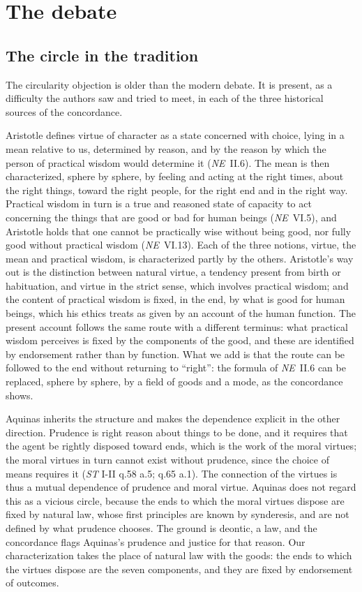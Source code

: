 \documentclass{situationist-preprint}
\begin{document}
\section{The debate}\label{s:history}

\subsection{The circle in the tradition}

The circularity objection is older than the modern debate. It is present, as a difficulty the authors saw and tried to meet, in each of the three historical sources of the concordance.

Aristotle defines virtue of character as a state concerned with choice, lying in a mean relative to us, determined by reason, and by the reason by which the person of practical wisdom would determine it (\emph{NE}~II.6). The mean is then characterized, sphere by sphere, by feeling and acting at the right times, about the right things, toward the right people, for the right end and in the right way. Practical wisdom in turn is a true and reasoned state of capacity to act concerning the things that are good or bad for human beings (\emph{NE}~VI.5), and Aristotle holds that one cannot be practically wise without being good, nor fully good without practical wisdom (\emph{NE}~VI.13). Each of the three notions, virtue, the mean and practical wisdom, is characterized partly by the others. Aristotle's way out is the distinction between natural virtue, a tendency present from birth or habituation, and virtue in the strict sense, which involves practical wisdom; and the content of practical wisdom is fixed, in the end, by what is good for human beings, which his ethics treats as given by an account of the human function. The present account follows the same route with a different terminus: what practical wisdom perceives is fixed by the components of the good, and these are identified by endorsement rather than by function. What we add is that the route can be followed to the end without returning to \enquote{right}: the formula of \emph{NE}~II.6 can be replaced, sphere by sphere, by a field of goods and a mode, as the concordance shows.

Aquinas inherits the structure and makes the dependence explicit in the other direction. Prudence is right reason about things to be done, and it requires that the agent be rightly disposed toward ends, which is the work of the moral virtues; the moral virtues in turn cannot exist without prudence, since the choice of means requires it (\emph{ST} I-II q.58 a.5; q.65 a.1). The connection of the virtues is thus a mutual dependence of prudence and moral virtue. Aquinas does not regard this as a vicious circle, because the ends to which the moral virtues dispose are fixed by natural law, whose first principles are known by synderesis, and are not defined by what prudence chooses. The ground is deontic, a law, and the concordance flags Aquinas's prudence and justice for that reason. Our characterization takes the place of natural law with the goods: the ends to which the virtues dispose are the seven components, and they are fixed by endorsement of outcomes.
\end{document}
